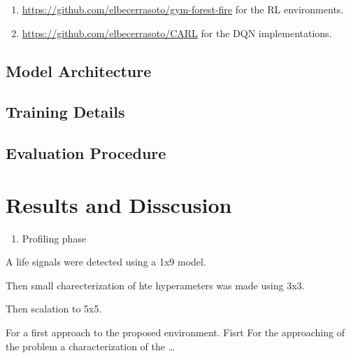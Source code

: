 \documentclass[
]{book}
\providecommand{\tightlist}{%
  \setlength{\itemsep}{0pt}\setlength{\parskip}{0pt}}
\begin{document}
\begin{enumerate}
\def\labelenumi{\arabic{enumi}.}
\tightlist
\item
  \url{https://github.com/elbecerrasoto/gym-forest-fire} for the RL environments.
\item
  \url{https://github.com/elbecerrasoto/CARL} for the DQN implementations.
\end{enumerate}

\hypertarget{model-architecture}{%
\subsection{Model Architecture}\label{model-architecture}}

\hypertarget{training-details}{%
\subsection{Training Details}\label{training-details}}

\hypertarget{evaluation-procedure}{%
\subsection{Evaluation Procedure}\label{evaluation-procedure}}

\hypertarget{results-and-disscusion}{%
\section{Results and Disscusion}\label{results-and-disscusion}}

\begin{enumerate}
\def\labelenumi{\arabic{enumi}.}
\tightlist
\item
  Profiling phase
\end{enumerate}

A life signals were detected using a 1x9 model.

Then small charecterization of hte hyperameters was made using 3x3.

Then scalation to 5x5.

For a first approach to the proposed environment. Fisrt
For the approaching of the problem a characterization of the \ldots{}
\end{document}
